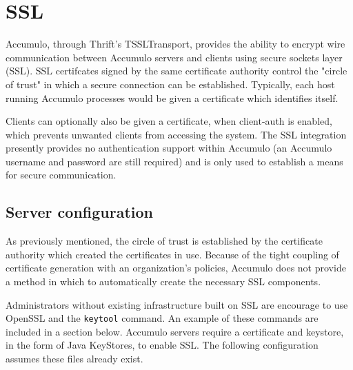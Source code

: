 
%
%

\chapter{SSL} 
Accumulo, through Thrift's TSSLTransport, provides the ability to encrypt
wire communication between Accumulo servers and clients using secure
sockets layer (SSL). SSL certifcates signed by the same certificate authority
control the "circle of trust" in which a secure connection can be established.
Typically, each host running Accumulo processes would be given a certificate
which identifies itself.

Clients can optionally also be given a certificate, when client-auth is enabled,
which prevents unwanted clients from accessing the system. The SSL integration
presently provides no authentication support within Accumulo (an Accumulo username
and password are still required) and is only used to establish a means for
secure communication.

\section{Server configuration}

As previously mentioned, the circle of trust is established by the certificate
authority which created the certificates in use. Because of the tight coupling
of certificate generation with an organization's policies, Accumulo does not
provide a method in which to automatically create the necessary SSL components.

Administrators without existing infrastructure built on SSL are encourage to
use OpenSSL and the \texttt{keytool} command. An example of these commands are
included in a section below. Accumulo servers require a certificate and keystore,
in the form of Java KeyStores, to enable SSL. The following configuration assumes
these files already exist.


